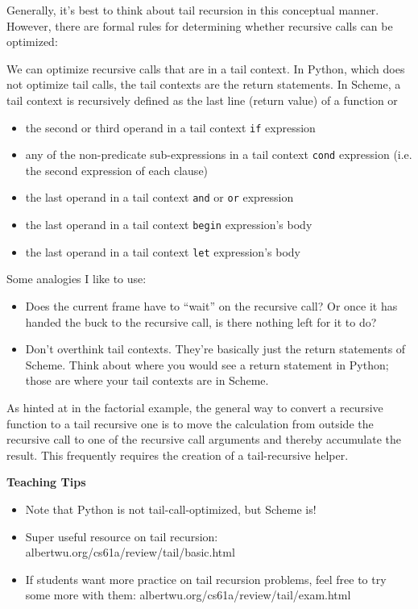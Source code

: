 Generally, it's best to think about tail recursion in this conceptual manner. However, there are formal rules for determining whether recursive calls can be optimized: 

We can optimize recursive calls that are in a tail context. In Python, which does not optimize tail calls, the tail contexts are the return statements. In Scheme, a tail context is recursively defined as the last line (return value) of a function or 
\begin{itemize}
\item the second or third operand in a tail context \lstinline{if} expression
\item any of the non-predicate sub-expressions in a tail context \lstinline{cond} expression (i.e. the second expression of each clause)
\item the last operand in a tail context \lstinline{and} or \lstinline{or} expression
\item the last operand in a tail context \lstinline{begin} expression's body
\item the last operand in a tail context \lstinline{let} expression's body
\end{itemize}

\begin{meta}
  Some analogies I like to use:
  \begin{itemize}
    \item Does the current frame have to ``wait'' on the recursive call? Or once it has handed the buck to the recursive call, is there nothing left for it to do? 
    \item Don't overthink tail contexts. They're basically just the return statements of Scheme. Think about where you would see a return statement in Python; those are where your tail contexts are in Scheme. 
  \end{itemize}
  \end{meta}

As hinted at in the factorial example, the general way to convert a recursive function to a tail recursive one is to move the calculation from outside the recursive call to one of the recursive call arguments and thereby accumulate the result. This frequently requires the creation of a tail-recursive helper. 

\begin{guide}
\begin{blocksection}
\textbf{Teaching Tips}
  \begin{itemize}
    \item Note that Python is not tail-call-optimized, but Scheme is!
    \item Super useful resource on tail recursion: albertwu.org/cs61a/review/tail/basic.html
    \item If students want more practice on tail recursion problems, feel free to try some more with them: albertwu.org/cs61a/review/tail/exam.html
  \end{itemize}
\end{blocksection}
\end{guide}
